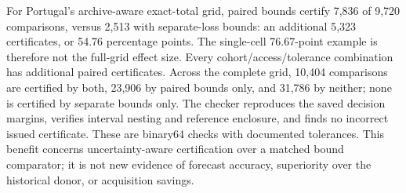 \documentclass[12pt]{article}
\begin{document}
For Portugal's archive-aware exact-total grid, paired bounds certify
7,836 of 9,720 comparisons, versus 2,513 with separate-loss bounds: an
additional 5,323 certificates, or 54.76 percentage points. The single-cell
76.67-point example is therefore not the full-grid effect size.
Every cohort/access/tolerance combination has additional paired certificates.
Across the complete grid, 10,404 comparisons are certified by both,
23,906 by paired bounds only, and 31,786 by neither; none is certified by
separate bounds only. The checker reproduces the saved decision margins,
verifies interval nesting and reference enclosure, and finds no incorrect
issued certificate. These are binary64 checks with documented tolerances.
This benefit concerns uncertainty-aware certification over a matched bound
comparator; it is not new evidence of forecast accuracy, superiority over
the historical donor, or acquisition savings.
\end{document}
